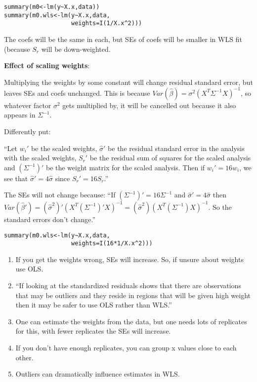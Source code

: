 \begin{verbatim}
summary(m0<-lm(y~X.x,data))
summary(m0.wls<-lm(y~X.x,data,
                   weights=I(1/X.x^2)))
\end{verbatim}

The coefs will be the same in each, but SEs of coefs will be smaller in WLS fit (because $S_r$ will be down-weighted.

\textbf{Effect of scaling weights}:

Multiplying the weights by some constant will change residual standard error, but leaves SEs and coefs unchanged. This is because $Var(\hat{\beta})=\sigma^2 (X^T \Sigma^{-1} X)^{-1}$, so whatever factor $\sigma^2$ gets multiplied by, it will be cancelled out because it also appears in $ \Sigma^{-1}$.

Differently put:

``Let $w_i'$ be the scaled weights, $\hat{\sigma}'$ be the residual standard error in the analysis with the scaled weights, $S_r'$ be the residual sum of squares for the scaled analysis and $(\Sigma^{-1})'$ be the weight matrix for the scaled analysis. Then if $w_i' = 16w_i$, we see that $\hat{\sigma}' = 4\hat{\sigma}$ since $S_r' = 16S_r$.''

The SEs will not change because: ``If 
$(\Sigma^{-1})'=16\Sigma^{-1}$ and 
$\hat{\sigma}' = 4\hat{\sigma}$ 
then $Var(\hat{\beta}') = 
(\hat{\sigma}^2)' (X^T (\Sigma^{-1})'X)^{-1} =
(\hat{\sigma}^2)  (X^T (\Sigma^{-1})X)^{-1}$.
So the standard errors don’t change.''

\begin{verbatim}
summary(m0.wls<-lm(y~X.x,data,
                   weights=I(16*1/X.x^2)))
\end{verbatim}

\begin{enumerate}
\item
If you get the weights wrong, SEs will increase. So, if unsure about weights use OLS.
\item
``If looking at the standardized residuals shows that there are observations that may be outliers and they reside in regions that will be given high weight then it may be safer to use OLS rather than WLS.''
\item One can estimate the weights from the data, but one needs lots of replicates for this, with fewer replicates the SEs will increase.
\item If you don't have enough replicates, you can group x values close to each other.
\item Outliers can dramatically influence estimates in WLS.
\end{enumerate}

